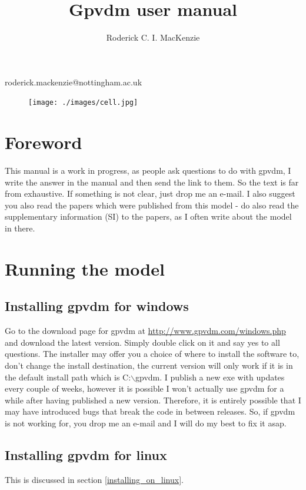 \documentclass[11pt]{article}
\begin{document}
\title{Gpvdm user manual}

\author{Roderick C. I. MacKenzie}


\maketitle




\centerline{roderick.mackenzie@nottingham.ac.uk}


\begin{figure}[ht!]
\centering
\texttt{[image: ./images/cell.jpg]}
\label{overflow}
\end{figure}

\newpage
\section{Foreword}
This manual is a work in progress, as people ask questions to do with gpvdm, I write the answer in the manual and then send the link to them.  So the text is far from exhaustive.  If something is not clear, just drop me an e-mail.  I also suggest you also read the papers which were published from this model - do also read the supplementary information (SI) to the papers, as I often write about the model in there.

\section{Running the model}

\subsection{Installing gpvdm for windows}
Go to the download page for gpvdm at \url{http://www.gpvdm.com/windows.php} and download the latest version.  Simply double click on it and say yes to all questions.  The installer may offer you a choice of where to install the software to, don't change the install destination, the current version will only work if it is in the default install path which is C:$\backslash$gpvdm.  I publish a new exe with updates every couple of weeks, however it is possible I won't actually use gpvdm for a while after having published a new version.  Therefore, it is entirely possible that I may have introduced bugs that break the code in between releases.  So, if gpvdm is not working for, you drop me an e-mail and I will do my best to fix it asap.

\subsection{Installing gpvdm for linux}
This is discussed in section \ref{installing_on_linux}.
\end{document}

